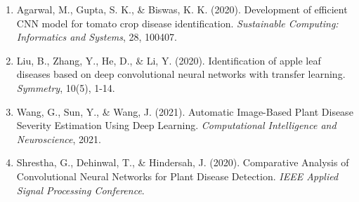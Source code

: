 \documentclass[a4paper,12pt]{article}
\begin{document}
\begin{enumerate}
    \item Agarwal, M., Gupta, S. K., \& Biswas, K. K. (2020). Development of efficient CNN model for tomato crop disease identification. \textit{Sustainable Computing: Informatics and Systems}, 28, 100407.
    \item Liu, B., Zhang, Y., He, D., \& Li, Y. (2020). Identification of apple leaf diseases based on deep convolutional neural networks with transfer learning. \textit{Symmetry}, 10(5), 1-14.
    \item Wang, G., Sun, Y., \& Wang, J. (2021). Automatic Image-Based Plant Disease Severity Estimation Using Deep Learning. \textit{Computational Intelligence and Neuroscience}, 2021.
    \item Shrestha, G., Dehinwal, T., \& Hindersah, J. (2020). Comparative Analysis of Convolutional Neural Networks for Plant Disease Detection. \textit{IEEE Applied Signal Processing Conference}.
\end{enumerate}
\end{document}
